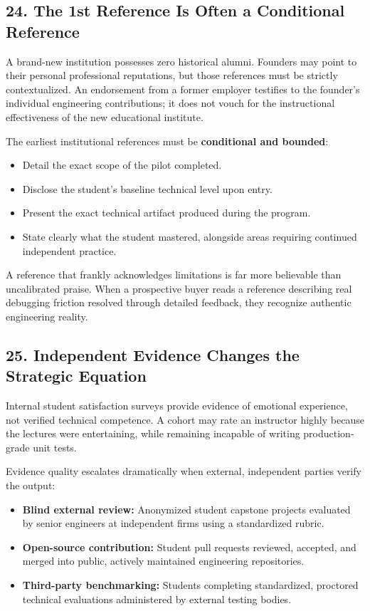 \subsection*{24. The 1st Reference Is Often a Conditional Reference}

A brand-new institution possesses zero historical alumni. Founders may point to their personal professional reputations, but those references must be strictly contextualized. An endorsement from a former employer testifies to the founder's individual engineering contributions; it does not vouch for the instructional effectiveness of the new educational institute.

The earliest institutional references must be \textbf{conditional and bounded}:
\begin{itemize}
\item Detail the exact scope of the pilot completed.
\item Disclose the student's baseline technical level upon entry.
\item Present the exact technical artifact produced during the program.
\item State clearly what the student mastered, alongside areas requiring continued independent practice.
\end{itemize}

A reference that frankly acknowledges limitations is far more believable than uncalibrated praise. When a prospective buyer reads a reference describing real debugging friction resolved through detailed feedback, they recognize authentic engineering reality.

\subsection*{25. Independent Evidence Changes the Strategic Equation}

Internal student satisfaction surveys provide evidence of emotional experience, not verified technical competence. A cohort may rate an instructor highly because the lectures were entertaining, while remaining incapable of writing production-grade unit tests. 

Evidence quality escalates dramatically when external, independent parties verify the output:
\begin{itemize}
\item \textbf{Blind external review:} Anonymized student capstone projects evaluated by senior engineers at independent firms using a standardized rubric.
\item \textbf{Open-source contribution:} Student pull requests reviewed, accepted, and merged into public, actively maintained engineering repositories.
\item \textbf{Third-party benchmarking:} Students completing standardized, proctored technical evaluations administered by external testing bodies.
\end{itemize}

